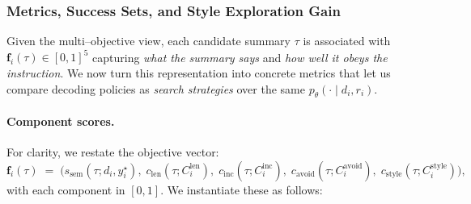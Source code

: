 \subsubsection{Metrics, Success Sets, and Style Exploration Gain}
\label{subsubsec:style-metrics}

Given the multi--objective view, each candidate summary $\tau$ is
associated with $\mathbf{f}_i(\tau) \in [0,1]^5$ capturing
\emph{what the summary says} and \emph{how well it obeys the
instruction}. We now turn this representation into concrete metrics that
let us compare decoding policies as \emph{search strategies} over the
same $p_\theta(\cdot \mid d_i, r_i)$.

\paragraph{Component scores.}
For clarity, we restate the objective vector:
\[
  \mathbf{f}_i(\tau)
  \;=\;
  \bigl(
    s_{\text{sem}}(\tau; d_i, y_i^\star),\;
    c_{\text{len}}(\tau; C^{\text{len}}_i),\;
    c_{\text{inc}}(\tau; C^{\text{inc}}_i),\;
    c_{\text{avoid}}(\tau; C^{\text{avoid}}_i),\;
    c_{\text{style}}(\tau; C^{\text{style}}_i)
  \bigr),
\]
with each component in $[0,1]$. We instantiate these as follows:
